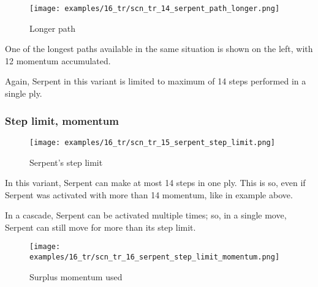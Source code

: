 
\vspace*{5.3\baselineskip}
\noindent
\begin{wrapfigure}[7]{l}{0.4\textwidth}
\centering
\texttt{[image: examples/16\_tr/scn\_tr\_14\_serpent\_path\_longer.png]}
\vspace*{-0.5\baselineskip}
\caption{Longer path}
\label{fig:scn_tr_14_serpent_path_longer}
\end{wrapfigure}
One of the longest paths available in the same situation is shown on the left,
with 12 momentum accumulated.

Again, Serpent in this variant is limited to maximum of 14 steps performed in a
single ply.

\clearpage %

\subsubsection*{Step limit, momentum}
\label{sec:Tamoanchan Revisited/Serpent/Movement/Step limit, momentum}

\vspace*{-1.2\baselineskip}
\noindent
\begin{figure}[!h]
\texttt{[image: examples/16\_tr/scn\_tr\_15\_serpent\_step\_limit.png]}
\caption{Serpent's step limit}
\label{fig:scn_tr_15_serpent_step_limit}
\end{figure}

In this variant, Serpent can make at most 14 steps in one ply. This is so,
even if Serpent was activated with more than 14 momentum, like in example
above.

In a cascade, Serpent can be activated multiple times; so, in a single move,
Serpent can still move for more than its step limit.

\clearpage %

\vspace*{-2.1\baselineskip}
\noindent
\begin{figure}[!h]
\texttt{[image: examples/16\_tr/scn\_tr\_16\_serpent\_step\_limit\_momentum.png]}
\caption{Surplus momentum used}
\label{fig:scn_tr_16_serpent_step_limit_momentum}
\end{figure}

